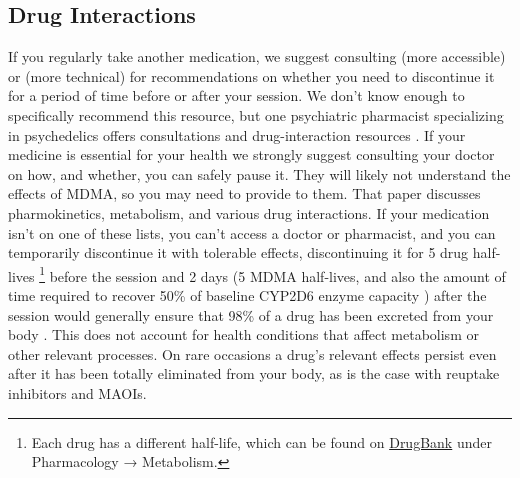 \documentclass[12pt,letterpaper]{book}
\begin{document}
\subsection*{Drug Interactions}
If you regularly take another medication, we suggest consulting \textcite{liechtiInteractions} (more accessible) or \textcite{sarparastDrugInteractions} (more technical) for recommendations on whether you need to discontinue it for a period of time before or after your session. We don't know enough to specifically recommend this resource, but one psychiatric pharmacist specializing in psychedelics offers consultations and drug-interaction resources \cite{spiritPharmacist}. If your medicine is essential for your health we strongly suggest consulting your doctor on how, and whether, you can safely pause it. They will likely not understand the effects of MDMA, so you may need to provide \textcite{sarparastDrugInteractions} to them. That paper discusses pharmokinetics, metabolism, and various drug interactions. If your medication isn't on one of these lists, you can't access a doctor or pharmacist, and you can temporarily discontinue it with tolerable effects, discontinuing it for 5 drug half-lives \footnote{Each drug has a different half-life, which can be found on \href{https://go.drugbank.com}{DrugBank} under Pharmacology → Metabolism.} before the session and 2 days (5 MDMA half-lives, and also the amount of time required to recover 50\% of baseline CYP2D6 enzyme capacity \cite{omathunaCYP}) after the session would generally ensure that 98\% of a drug has been excreted from your body \cite{andradeHalf,torrePharmacology}. This does not account for health conditions that affect metabolism or other relevant processes. On rare occasions a drug's relevant effects persist even after it has been totally eliminated from your body, as is the case with reuptake inhibitors and MAOIs.
\end{document}
